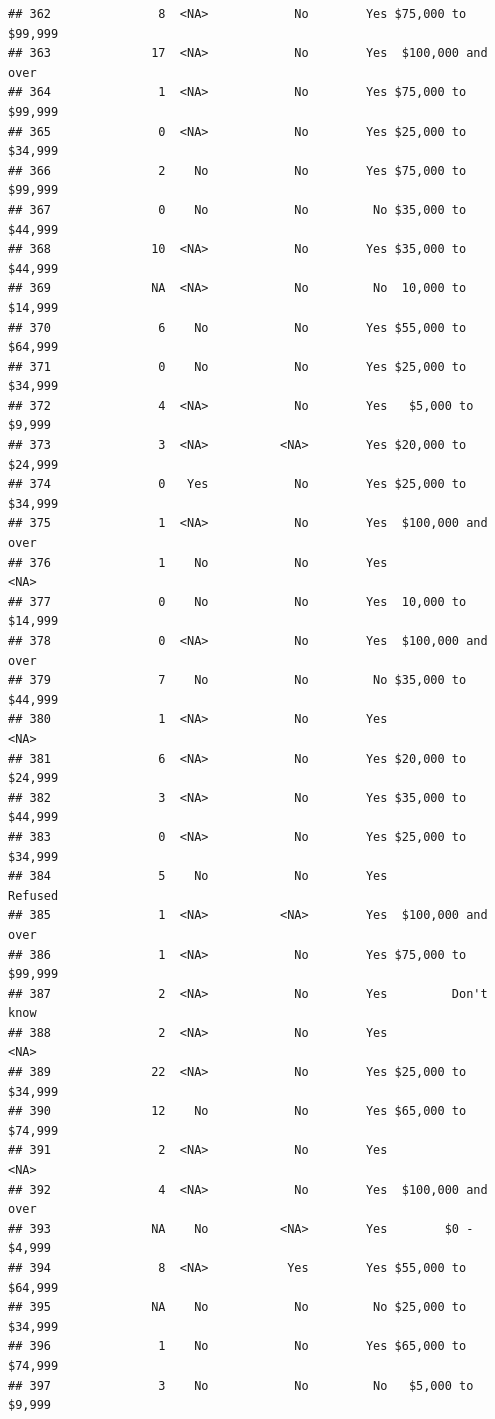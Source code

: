 \documentclass[man]{apa6}
\begin{document}
\begin{verbatim}
## 362               8  <NA>            No        Yes $75,000 to $99,999
## 363              17  <NA>            No        Yes  $100,000 and over
## 364               1  <NA>            No        Yes $75,000 to $99,999
## 365               0  <NA>            No        Yes $25,000 to $34,999
## 366               2    No            No        Yes $75,000 to $99,999
## 367               0    No            No         No $35,000 to $44,999
## 368              10  <NA>            No        Yes $35,000 to $44,999
## 369              NA  <NA>            No         No  10,000 to $14,999
## 370               6    No            No        Yes $55,000 to $64,999
## 371               0    No            No        Yes $25,000 to $34,999
## 372               4  <NA>            No        Yes   $5,000 to $9,999
## 373               3  <NA>          <NA>        Yes $20,000 to $24,999
## 374               0   Yes            No        Yes $25,000 to $34,999
## 375               1  <NA>            No        Yes  $100,000 and over
## 376               1    No            No        Yes               <NA>
## 377               0    No            No        Yes  10,000 to $14,999
## 378               0  <NA>            No        Yes  $100,000 and over
## 379               7    No            No         No $35,000 to $44,999
## 380               1  <NA>            No        Yes               <NA>
## 381               6  <NA>            No        Yes $20,000 to $24,999
## 382               3  <NA>            No        Yes $35,000 to $44,999
## 383               0  <NA>            No        Yes $25,000 to $34,999
## 384               5    No            No        Yes            Refused
## 385               1  <NA>          <NA>        Yes  $100,000 and over
## 386               1  <NA>            No        Yes $75,000 to $99,999
## 387               2  <NA>            No        Yes         Don't know
## 388               2  <NA>            No        Yes               <NA>
## 389              22  <NA>            No        Yes $25,000 to $34,999
## 390              12    No            No        Yes $65,000 to $74,999
## 391               2  <NA>            No        Yes               <NA>
## 392               4  <NA>            No        Yes  $100,000 and over
## 393              NA    No          <NA>        Yes        $0 - $4,999
## 394               8  <NA>           Yes        Yes $55,000 to $64,999
## 395              NA    No            No         No $25,000 to $34,999
## 396               1    No            No        Yes $65,000 to $74,999
## 397               3    No            No         No   $5,000 to $9,999

\end{verbatim}
\end{document}
